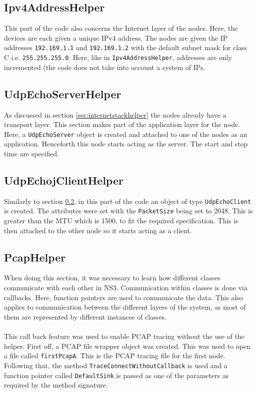 \documentclass[a4paper, 12pt]{article}
\begin{document}
\subsection{Ipv4AddressHelper}
This part of the code also concerns the Internet layer of the nodes. Here, the devices are each given a unique IPv4 address. The nodes are given the IP addresses \texttt{192.169.1.1} and \texttt{192.169.1.2} with the default subnet mask for class C i.e. \texttt{255.255.255.0}. Here, like in \texttt{Ipv4AddressHelper}, addresses are only incremented (the code does not take into account a system of IPs.

\subsection{UdpEchoServerHelper}
\label{sec:udpechoserverhelper}

As discussed in section \ref{sec:internetstackhelper} the nodes already have a transport layer. This section makes part of the application layer for the node. Here, a \texttt{UdpEchoServer} object is created and attached to one of the nodes as an application. Henceforth this node starts acting as the server. The start and stop time are specified.

\subsection{UdpEchojClientHelper}
Similarly to section \ref{sec:udpechoserverhelper}, in this part of the code an object of type \texttt{UdpEchoClient} is created. The attributes were set with the \texttt{PacketSize} being set to 2048. This is greater than the MTU which is 1500, to fit the required specification. This is then attached to the other node so it starts acting as a client. 
 	
 
\subsection{PcapHelper} 
\label{sec:pcaphelper}
When doing this section, it was necessary to learn how different classes communicate with each other in NS3. Communication within classes is done via callbacks. Here, function pointers are used to communicate the data. This also applies to communication between the different layers of the system, as most of them are represented by different instances of classes.

\paragraph{}
This call back feature was used to enable PCAP tracing without the use of the helper. First off, a PCAP file wrapper object was created. This was used to open a file called \texttt{firstPcapA}. This is the PCAP tracing file for the first node.
Following that, the method \texttt{TraceConnectWithoutCallback} is used and a function pointer called \texttt{DefaultSink} is passed as one of the parameters as required by the method signature. 
\end{document}
